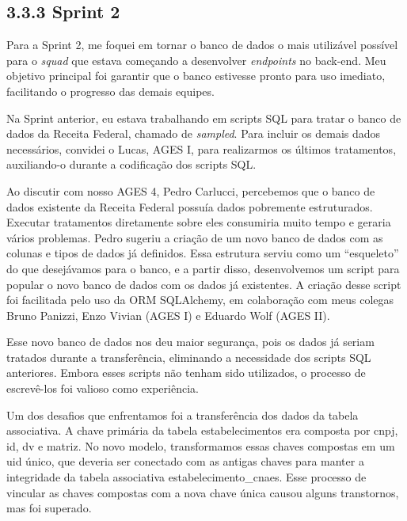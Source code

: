 \hypertarget{__RefHeading___Toc4789_3118176633}{}
\subsection*{3.3.3 Sprint 2}
\label{unit:ages-ii-sprint-2}

\indent Para a Sprint 2, me foquei em tornar o banco de dados o mais utilizável possível para o \textit{squad} que estava começando a desenvolver \textit{endpoints} no back-end. Meu objetivo principal foi garantir que o banco estivesse pronto para uso imediato, facilitando o progresso das demais equipes.\par

\indent Na Sprint anterior, eu estava trabalhando em scripts SQL para tratar o banco de dados da Receita Federal, chamado de \textit{sampled}. Para incluir os demais dados necessários, convidei o Lucas, AGES I, para realizarmos os últimos tratamentos, auxiliando-o durante a codificação dos scripts SQL.\par

\indent Ao discutir com nosso AGES 4, Pedro Carlucci, percebemos que o banco de dados existente da Receita Federal possuía dados pobremente estruturados. Executar tratamentos diretamente sobre eles consumiria muito tempo e geraria vários problemas. Pedro sugeriu a criação de um novo banco de dados com as colunas e tipos de dados já definidos. Essa estrutura serviu como um “esqueleto” do que desejávamos para o banco, e a partir disso, desenvolvemos um script para popular o novo banco de dados com os dados já existentes. A criação desse script foi facilitada pelo uso da ORM SQLAlchemy, em colaboração com meus colegas Bruno Panizzi, Enzo Vivian (AGES I) e Eduardo Wolf (AGES II).\par

\indent Esse novo banco de dados nos deu maior segurança, pois os dados já seriam tratados durante a transferência, eliminando a necessidade dos scripts SQL anteriores. Embora esses scripts não tenham sido utilizados, o processo de escrevê-los foi valioso como experiência.\par

\indent Um dos desafios que enfrentamos foi a transferência dos dados da tabela associativa. A chave primária da tabela estabelecimentos era composta por cnpj, id, dv e matriz. No novo modelo, transformamos essas chaves compostas em um uid único, que deveria ser conectado com as antigas chaves para manter a integridade da tabela associativa estabelecimento\_cnaes. Esse processo de vincular as chaves compostas com a nova chave única causou alguns transtornos, mas foi superado.\par

